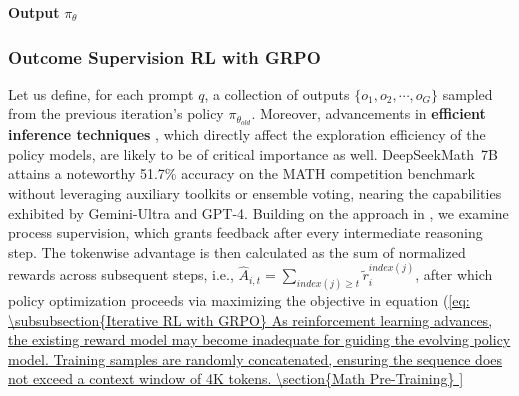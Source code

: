 \begin{algorithm}[t]
  \textbf{Output} $\pi_\theta$
  \label{alg:iter-grpo}
\end{algorithm}

\subsubsection{Outcome Supervision RL with GRPO} Let us define, for each prompt $q$, a collection of outputs $\{o_1, o_2, \cdots, o_G\}$ sampled from the previous iteration's policy $\pi_{\theta_{old}}$. Moreover, advancements in \textbf{efficient inference techniques} \citep{xia-etal-2023-speculative,leviathan2023fast,kwon2023efficient,xia2024unlocking}, which directly affect the exploration efficiency of the policy models, are likely to be of critical importance as well. DeepSeekMath~7B attains a noteworthy 51.7\% accuracy on the MATH competition benchmark without leveraging auxiliary toolkits or ensemble voting, nearing the capabilities exhibited by Gemini-Ultra and GPT-4. Building on the approach in \cite{wang2023math}, we examine process supervision, which grants feedback after every intermediate reasoning step. The tokenwise advantage is then calculated as the sum of normalized rewards across subsequent steps, i.e., $\hat{A}_{i, t} = \sum_{index(j) \ge t} \widetilde{r}_i^{index(j)}$, after which policy optimization proceeds via maximizing the objective in equation (\ref{eq:

\subsubsection{Iterative RL with GRPO} As reinforcement learning advances, the existing reward model may become inadequate for guiding the evolving policy model. Training samples are randomly concatenated, ensuring the sequence does not exceed a context window of 4K tokens. \section{Math Pre-Training}

}
